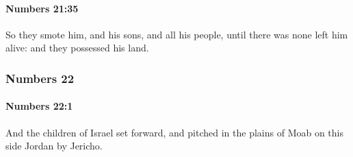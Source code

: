 		\paragraph{Numbers 21:35} %
			\label{NUMBERS-21-35}

			So they smote him, and his sons, and all his people, until there was none left him alive: and they possessed his land.

	\subsubsection{Numbers 22} %
		\label{NUMBERS-22}

		\paragraph{Numbers 22:1} %
			\label{NUMBERS-22-1}

			And the children of Israel set forward, and pitched in the plains of Moab on this side Jordan by Jericho.

